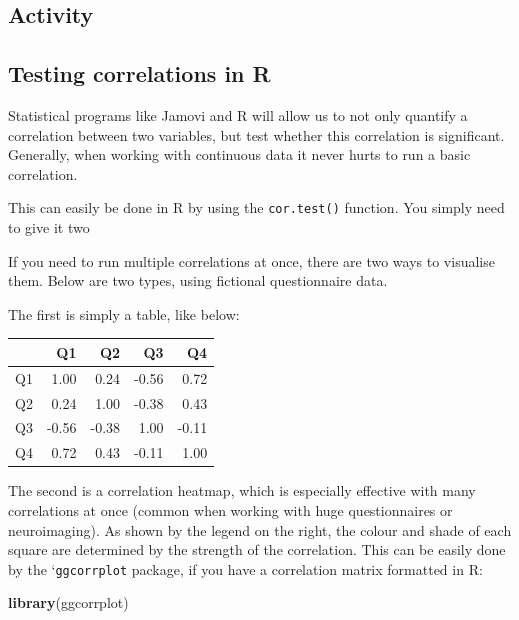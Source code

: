 \documentclass[
]{book}
\newenvironment{Shaded}{\begin{snugshade}}{\end{snugshade}}
\newcommand{\FunctionTok}[1]{\textcolor[rgb]{0.13,0.29,0.53}{\textbf{#1}}}
\newcommand{\NormalTok}[1]{#1}
\begin{document}
\hypertarget{activity}{%
\subsection{Activity}\label{activity}}

\hypertarget{testing-correlations-in-r}{%
\subsection{Testing correlations in R}\label{testing-correlations-in-r}}

Statistical programs like Jamovi and R will allow us to not only quantify a correlation between two variables, but test whether this correlation is significant. Generally, when working with continuous data it never hurts to run a basic correlation.

This can easily be done in R by using the \texttt{cor.test()} function. You simply need to give it two

If you need to run multiple correlations at once, there are two ways to visualise them. Below are two types, using fictional questionnaire data.

The first is simply a table, like below:

\begin{tabular}{l|r|r|r|r}
\hline
  & Q1 & Q2 & Q3 & Q4\\
\hline
Q1 & 1.00 & 0.24 & -0.56 & 0.72\\
\hline
Q2 & 0.24 & 1.00 & -0.38 & 0.43\\
\hline
Q3 & -0.56 & -0.38 & 1.00 & -0.11\\
\hline
Q4 & 0.72 & 0.43 & -0.11 & 1.00\\
\hline
\end{tabular}

The second is a correlation heatmap, which is especially effective with many correlations at once (common when working with huge questionnaires or neuroimaging). As shown by the legend on the right, the colour and shade of each square are determined by the strength of the correlation. This can be easily done by the `\texttt{ggcorrplot} package, if you have a correlation matrix formatted in R:

\begin{Shaded}
\begin{Highlighting}[]
\FunctionTok{library}\NormalTok{(ggcorrplot)}
\end{Highlighting}
\end{Shaded}
\end{document}
